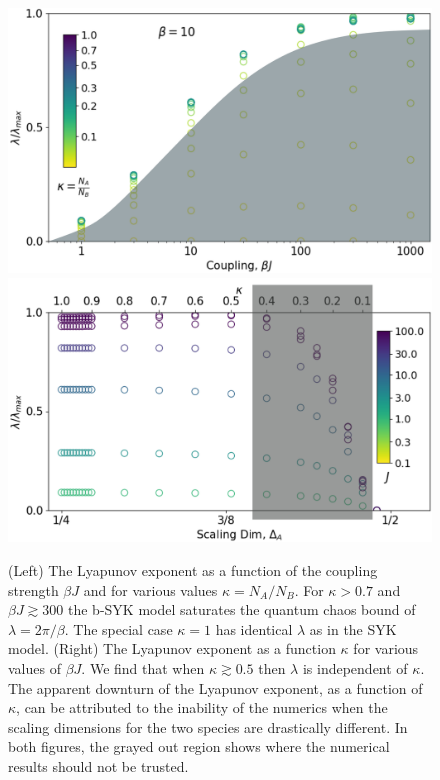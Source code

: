 \begin{figure}
	\includegraphics[width=1.00\columnwidth]{figures/chapter1/bSYK_Lyaponov_convergence.png}
	\includegraphics[width=1.00\columnwidth]{figures/chapter1/bSYK_Lyaponov_k_grid.png}
	\caption{(Left) The Lyapunov exponent as a function of the coupling strength $\beta J$ and for various values $\kappa=N_A/N_B$.
		For $\kappa > 0.7$ and $\beta J \gtrsim 300$ the b-SYK model saturates the quantum chaos bound of $\lambda = 2\pi/\beta$.
		The special case $\kappa=1$ has identical $\lambda$ as in the SYK model.
		(Right) The Lyapunov exponent as a function $\kappa$ for various values of $\beta J$.
		We find that when $\kappa \gtrsim 0.5$ then $\lambda$ is independent of $\kappa$.
		The apparent downturn of the Lyapunov exponent, as a function of $\kappa$, can be attributed to the inability of the numerics when the scaling dimensions for the two species are drastically different.
		In both figures, the grayed out region shows where the numerical results should not be trusted. 
	}
	\label{fig_Lyaponov}
\end{figure}




